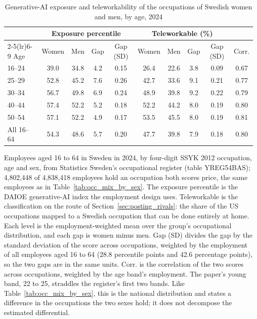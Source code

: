 \begin{table}[ht!]
\centering
\caption{Generative-AI exposure and teleworkability of the occupations of Swedish women and men, by age, 2024}
\label{tab:occ_mix_by_sex_telework}
\footnotesize
\setlength{\tabcolsep}{4pt}
\begin{tabular}{lccccccccc}
\toprule
 & \multicolumn{4}{c}{Exposure percentile} & \multicolumn{4}{c}{Teleworkable (\%)} & \\
\cmidrule(lr){2-5}\cmidrule(lr){6-9}
Age & Women & Men & Gap & Gap (SD) & Women & Men & Gap & Gap (SD) & Corr. \\
\midrule
16--24 & 39.0 & 34.8 & 4.2 & 0.15 & 26.4 & 22.6 & 3.8 & 0.09 & 0.67 \\
25--29 & 52.8 & 45.2 & 7.6 & 0.26 & 42.7 & 33.6 & 9.1 & 0.21 & 0.77 \\
30--34 & 56.7 & 49.8 & 6.9 & 0.24 & 48.9 & 39.8 & 9.2 & 0.22 & 0.79 \\
40--44 & 57.4 & 52.2 & 5.2 & 0.18 & 52.2 & 44.2 & 8.0 & 0.19 & 0.80 \\
50--54 & 57.1 & 52.2 & 4.9 & 0.17 & 53.5 & 45.5 & 8.0 & 0.19 & 0.81 \\
\midrule
All 16--64 & 54.3 & 48.6 & 5.7 & 0.20 & 47.7 & 39.8 & 7.9 & 0.18 & 0.80 \\
\bottomrule
\end{tabular}
\begin{minipage}{0.95\textwidth}\footnotesize\vspace{4pt}
Employees aged 16 to 64 in Sweden in 2024, by four-digit SSYK 2012 occupation, age and sex, from Statistics Sweden's occupational register (table YREG54BAS); 4,802,448 of 4,838,418 employees hold an occupation both scores price, the same employees as in Table~\ref{tab:occ_mix_by_sex}. The exposure percentile is the DAIOE generative-AI index the employment design uses. Teleworkable is the \citet{dingel2020many} classification on the route of Section~\ref{sec:posting_rivals}: the share of the US occupations mapped to a Swedish occupation that can be done entirely at home. Each level is the employment-weighted mean over the group's occupational distribution, and each gap is women minus men. Gap (SD) divides the gap by the standard deviation of the score across occupations, weighted by the employment of all employees aged 16 to 64 (28.8 percentile points and 42.6 percentage points), so the two gaps are in the same units. Corr. is the correlation of the two scores across occupations, weighted by the age band's employment. The paper's young band, 22 to 25, straddles the register's first two bands. Like Table~\ref{tab:occ_mix_by_sex}, this is the national distribution and states a difference in the occupations the two sexes hold; it does not decompose the estimated differential.
\end{minipage}
\end{table}
